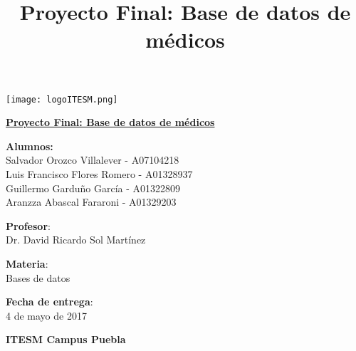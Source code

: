 \author{}
\date{}
\title{Proyecto Final: Base de datos de médicos}

\begin{titlepage}
    \centering
    \vfill
\texttt{[image: logoITESM.png]} 
 
 \vspace{1 cm}
   {\bfseries \Huge
    \underline{Proyecto Final: Base de datos de médicos}
   }    
    
    \vspace{3 cm} 
    
    {\large
   
        \textbf{Alumnos:}\\
    \vspace{0.3 cm} 
    Salvador Orozco Villalever - A07104218\\
        
        \vspace{0.3 cm} 
    Luis Francisco Flores Romero - A01328937\\
        
        \vspace{0.3 cm} 
    Guillermo Garduño García - A01322809\\
        
        \vspace{0.3 cm}
        Aranzza Abascal Fararoni - A01329203\\
        
        \vspace{1 cm} 

        \textbf{Profesor}:\\
        \vspace{0.3 cm} 
        Dr. David Ricardo Sol Martínez\\ 
        \vspace{1 cm} 

        \textbf{Materia}:\\
        \vspace{0.3 cm} 
        Bases de datos\\
        \vspace{1 cm} 

        \textbf{Fecha de entrega}:\\
        \vspace{0.3 cm} 
        4 de mayo de 2017\\
        \vspace{1 cm}

\textbf{ITESM Campus Puebla}\\
    }
    \vfill
    \vfill
    \vfill
\end{titlepage}

